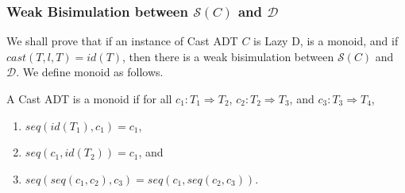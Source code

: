 \documentclass[acmsmall,review,anonymous]{acmart}\settopmatter{printfolios=true,printccs=false,printacmref=false}
\newcommand{\ineffCEKD}{\ensuremath{\mathcal{D}}}
\newcommand{\effCEK}[1]{\ensuremath{\mathcal{S}(#1)}}
\begin{document}
\subsubsection{Weak Bisimulation between \effCEK{C} and \ineffCEKD{}}

We shall prove that if an instance of Cast ADT $C$ is Lazy D, is a
monoid, and if $cast(T,l,T) = id(T)$, then there is
a weak bisimulation between \effCEK{C} and \ineffCEKD{}.
We define monoid as follows.

\begin{definition}[Monoid]
  A Cast ADT is a monoid if 
  for all
  $c_1 : T_1 \Longrightarrow T_2$,
  $c_2 : T_2 \Longrightarrow T_3$, and
  $c_3 : T_3 \Longrightarrow T_4$,
  \begin{enumerate}
    \item $seq(id(T_1),c_1) = c_1$,
    \item $seq(c_1,id(T_2)) = c_1$, and
    \item $seq(seq(c_1, c_2), c_3) = seq(c_1, seq(c_2, c_3))$.
  \end{enumerate}
\end{definition}


\end{document}
